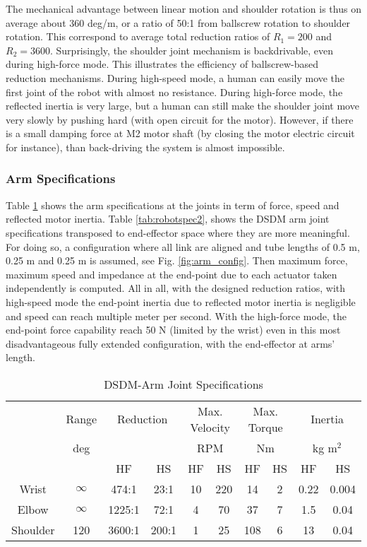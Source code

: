 The mechanical advantage between linear motion and shoulder rotation is thus on average about 360 deg/m, or a ratio of 50:1 from ballscrew rotation to shoulder rotation. This correspond to average total reduction ratios of $R_1 = 200 $ and $R_2 = 3600 $. Surprisingly, the shoulder joint mechanism is backdrivable, even during high-force mode. This illustrates the efficiency of ballscrew-based reduction mechanisms. During high-speed mode, a human can easily move the first joint of the robot with almost no resistance. During high-force mode, the reflected inertia is very large, but a human can still make the shoulder joint move very slowly by pushing hard (with open circuit for the motor). However, if there is a small damping force at M2 motor shaft (by closing the motor electric circuit for instance), than back-driving the system is almost impossible.  


\subsubsection{Arm Specifications} 

Table \ref{tab:robotspec} shows the arm specifications at the joints in term of force, speed and reflected motor inertia. Table \ref{tab:robotspec2}, shows the DSDM arm joint specifications transposed to end-effector space where they are more meaningful. For doing so, a configuration where all link are aligned and tube lengths of 0.5 m, 0.25 m and 0.25 m is assumed, see Fig. \ref{fig:arm_config}. Then maximum force, maximum speed and impedance at the end-point due to each actuator taken independently is computed. All in all, with the designed reduction ratios, with high-speed mode the end-point inertia due to reflected motor inertia is negligible and speed can reach multiple meter per second. With the high-force mode, the end-point force capability reach 50 N (limited by the wrist) even in this most disadvantageous fully extended configuration, with the end-effector at arms' length.  

\begin{table}[htbp]
	\centering
	\caption{DSDM-Arm Joint Specifications}
		\begin{tabular}{ c c c c c c c c c c }
			\hline
			   & Range  & \multicolumn{2}{c}{Reduction} & \multicolumn{2}{c}{Max. Velocity} & \multicolumn{2}{c}{Max. Torque} & \multicolumn{2}{c}{Inertia} \\
			   & deg & & &\multicolumn{2}{c}{RPM} & \multicolumn{2}{c}{Nm} & \multicolumn{2}{c}{kg m$^2$} \\
				\hline 
			  & & HF & HS & HF & HS & HF & HS & HF & HS \\
			\hline
			 Wrist & $\infty$ & 474:1  & 23:1  & 10 & 220 & 14  & 2 & 0.22 & 0.004 \\
			 Elbow & $\infty$ & 1225:1 & 72:1  & 4  & 70  & 37  & 7 & 1.5  & 0.04  \\
			 Shoulder & 120   & 3600:1 & 200:1 & 1  & 25  & 108 & 6 & 13   & 0.04  \\
			\hline
		\end{tabular}
	\label{tab:robotspec}
\end{table}

